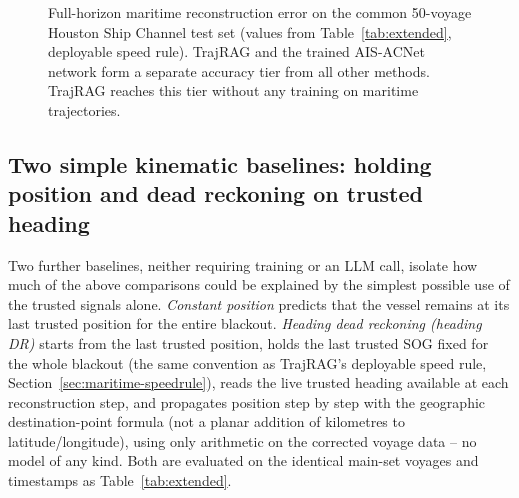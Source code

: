 \begin{figure}[t]
\centering
{}
\caption{Full-horizon maritime reconstruction error on the common 50-voyage
Houston Ship Channel test set (values from Table~\ref{tab:extended},
deployable speed rule). TrajRAG and the trained AIS-ACNet network form a
separate accuracy tier from all other methods. TrajRAG reaches this tier
without any training on maritime trajectories.}
\label{fig:barplot}
\end{figure}

\subsection{Two simple kinematic baselines: holding position and dead reckoning on trusted heading}
\label{sec:simple-baselines}

Two further baselines, neither requiring training or an LLM call, isolate
how much of the above comparisons could be explained by the simplest
possible use of the trusted signals alone. \emph{Constant position} predicts
that the vessel remains at its last trusted position for the entire
blackout. \emph{Heading dead reckoning (heading DR)} starts from the last
trusted position, holds the last trusted SOG fixed for the whole blackout
(the same convention as TrajRAG's deployable speed rule,
Section~\ref{sec:maritime-speedrule}), reads the live trusted heading
available at each reconstruction step, and propagates position step by step
with the geographic destination-point formula (not a planar addition of
kilometres to latitude/longitude), using only arithmetic on the corrected
voyage data -- no model of any kind. Both are evaluated on the identical
main-set voyages and timestamps as Table~\ref{tab:extended}.

